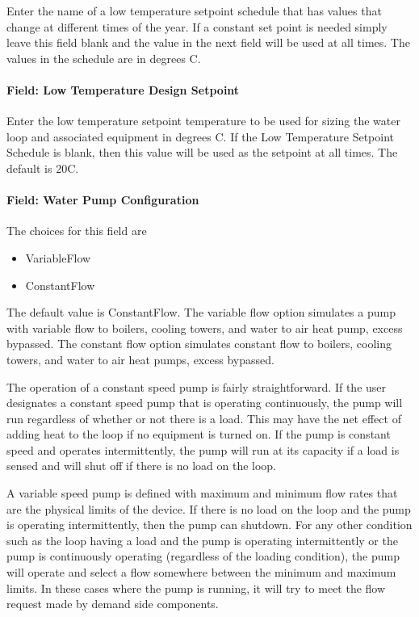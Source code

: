 Enter the name of a low temperature setpoint schedule that has values that change at different times of the year. If a constant set point is needed simply leave this field blank and the value in the next field will be used at all times. The values in the schedule are in degrees C.

\paragraph{Field: Low Temperature Design Setpoint}\label{field-low-temperature-design-setpoint}

Enter the low temperature setpoint temperature to be used for sizing the water loop and associated equipment in degrees C. If the Low Temperature Setpoint Schedule is blank, then this value will be used as the setpoint at all times. The default is 20C.

\paragraph{Field: Water Pump Configuration}\label{field-water-pump-configuration}

The choices for this field are

\begin{itemize}
\item
  VariableFlow
\item
  ConstantFlow
\end{itemize}

The default value is ConstantFlow. The variable flow option simulates a pump with variable flow to boilers, cooling towers, and water to air heat pump, excess bypassed. The constant flow option simulates constant flow to boilers, cooling towers, and water to air heat pumps, excess bypassed.

The operation of a constant speed pump is fairly straightforward. If the user designates a constant speed pump that is operating continuously, the pump will run regardless of whether or not there is a load. This may have the net effect of adding heat to the loop if no equipment is turned on. If the pump is constant speed and operates intermittently, the pump will run at its capacity if a load is sensed and will shut off if there is no load on the loop.

A variable speed pump is defined with maximum and minimum flow rates that are the physical limits of the device. If there is no load on the loop and the pump is operating intermittently, then the pump can shutdown. For any other condition such as the loop having a load and the pump is operating intermittently or the pump is continuously operating (regardless of the loading condition), the pump will operate and select a flow somewhere between the minimum and maximum limits. In these cases where the pump is running, it will try to meet the flow request made by demand side components.

